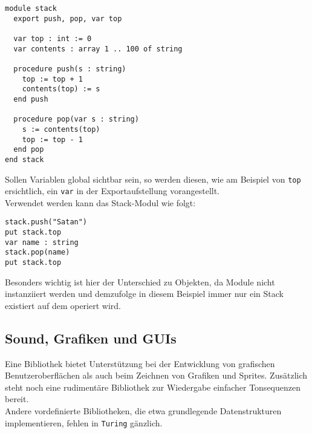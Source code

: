 \newpage

\lstset{label=LIS:stack:module}
\begin{table}[h!]
\begin{lstlisting}
module stack
  export push, pop, var top

  var top : int := 0
  var contents : array 1 .. 100 of string

  procedure push(s : string)
    top := top + 1
    contents(top) := s
  end push

  procedure pop(var s : string)
    s := contents(top)
    top := top - 1
  end pop
end stack
\end{lstlisting}
\end{table}

Sollen Variablen global sichtbar sein, so werden diesen, wie am Beispiel von \texttt{top} ersichtlich, ein \lstinline{var} in der Exportaufstellung vorangestellt. \\
Verwendet werden kann das Stack-Modul wie folgt:
\lstset{label=LIS:stack:module:use}
\begin{table}[h!]
\begin{lstlisting}
stack.push("Satan")
put stack.top
var name : string
stack.pop(name)
put stack.top
\end{lstlisting}
\end{table}

Besonders wichtig ist hier der Unterschied zu Objekten, da Module nicht instanziiert werden und demzufolge in diesem Beispiel immer nur ein Stack existiert auf dem operiert wird.

\subsection{Sound, Grafiken und GUIs}

Eine Bibliothek bietet Unterst\"utzung bei der Entwicklung von grafischen Benutzeroberfl\"achen als auch beim Zeichnen von Grafiken und Sprites. Zus\"atzlich steht noch eine rudiment\"are Bibliothek zur Wiedergabe einfacher Tonsequenzen bereit. \\
Andere vordefinierte Bibliotheken, die etwa grundlegende Datenstrukturen implementieren, fehlen in \texttt{Turing} g\"anzlich. \\

